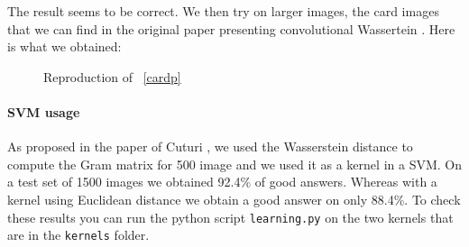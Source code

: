 The result seems to be correct. We then try on larger images, the card images that we can find in the original paper presenting convolutional Wassertein \cite{Goe++}. Here is what we obtained:

\begin{figure}[h]
	\centering
	\caption{Reproduction of \figurename~\ref{cardp}}
\end{figure}

\paragraph{SVM usage}
As proposed in the paper of Cuturi \cite{Cut}, we used the Wasserstein distance to compute the Gram matrix for 500 image and we used it as a kernel in a SVM. On a test set of 1500 images we obtained 92.4\% of good answers. Whereas with a kernel using Euclidean distance we obtain a good answer on only 88.4\%. To check these results you can run the python script \verb|learning.py| on the two kernels that are in the \verb|kernels| folder.
